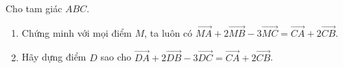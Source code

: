 \begin{bt}%
	Cho tam giác $ABC$.
	\begin{enumerate}
		\item Chứng minh với mọi điểm $M$, ta luôn có $\overrightarrow{MA}+2\overrightarrow{MB}-3 \overrightarrow{MC}=\overrightarrow{CA}+2\overrightarrow{CB}$.
		\item Hãy dựng điểm $D$ sao cho $\overrightarrow{DA}+2\overrightarrow{DB}-3 \overrightarrow{DC}=\overrightarrow{CA}+2\overrightarrow{CB}$.
	\end{enumerate}
\end{bt}
